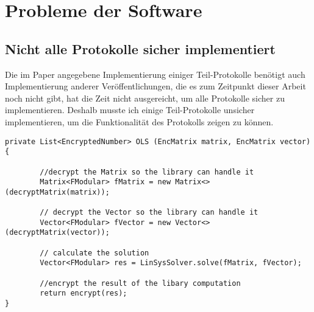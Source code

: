 \chapter{Probleme der Software}

\section{Nicht alle Protokolle sicher implementiert}
Die im Paper angegebene Implementierung einiger Teil-Protokolle benötigt auch Implementierung anderer Veröffentlichungen, die es zum Zeitpunkt dieser Arbeit noch nicht gibt, hat die Zeit nicht ausgereicht, um alle Protokolle sicher zu implementieren. Deshalb musste ich einige Teil-Protokolle unsicher implementieren, um die Funktionalität des Protokolls zeigen zu können.\\

\begin{lstlisting}[caption = Ausschnitt aus der unsicheren Implementierung von OLS (vereinfacht), label = {Code:OLS}]
private List<EncryptedNumber> OLS (EncMatrix matrix, EncMatrix vector){

		//decrypt the Matrix so the library can handle it
        Matrix<FModular> fMatrix = new Matrix<>(decryptMatrix(matrix));

        // decrypt the Vector so the library can handle it
        Vector<FModular> fVector = new Vector<>(decryptMatrix(vector));

        // calculate the solution
        Vector<FModular> res = LinSysSolver.solve(fMatrix, fVector);
        
        //encrypt the result of the libary computation
        return encrypt(res);
}
\end{lstlisting}

